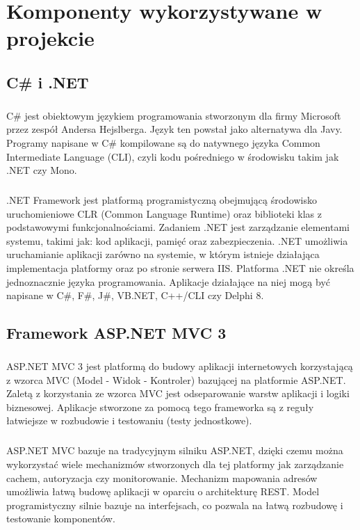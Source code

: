 \chapter{Komponenty wykorzystywane w projekcie}

\section{ C\# i .NET }
\paragraph{}
C\# jest obiektowym językiem programowania stworzonym dla firmy Microsoft przez zespół Andersa Hejslberga. Język ten powstał jako alternatywa dla Javy. Programy napisane w C\# kompilowane są do natywnego języka Common Intermediate Language (CLI), czyli kodu pośredniego w środowisku takim jak .NET czy Mono.
\paragraph{}
.NET Framework jest platformą programistyczną obejmującą środowisko uruchomieniowe CLR (Common Language Runtime) oraz biblioteki klas z podstawowymi funkcjonalnościami. Zadaniem .NET jest zarządzanie elementami systemu, takimi jak: kod aplikacji, pamięć oraz zabezpieczenia. .NET umożliwia uruchamianie aplikacji zarówno na systemie, w którym istnieje działająca implementacja platformy oraz po stronie serwera IIS. Platforma .NET nie określa jednoznacznie języka programowania. Aplikacje działające na niej mogą być napisane w C\#, F\#, J\#, VB.NET, C++/CLI czy Delphi 8. 

\section{Framework ASP.NET MVC 3}

\paragraph{}
ASP.NET MVC 3 jest platformą do budowy aplikacji internetowych korzystającą z wzorca MVC (Model - Widok - Kontroler) bazującej na platformie ASP.NET. Zaletą z korzystania ze wzorca MVC jest odseparowanie warstw aplikacji i logiki biznesowej. Aplikacje stworzone za pomocą tego frameworka są z reguły łatwiejsze w rozbudowie i testowaniu (testy jednostkowe).

\paragraph{}
ASP.NET MVC bazuje na tradycyjnym silniku ASP.NET, dzięki czemu można wykorzystać wiele mechanizmów stworzonych dla tej platformy jak zarządzanie cachem, autoryzacja czy monitorowanie. Mechanizm mapowania adresów umożliwia łatwą budowę aplikacji w oparciu o architekturę REST. Model programistyczny silnie bazuje na interfejsach, co pozwala na łatwą rozbudowę i testowanie komponentów.

